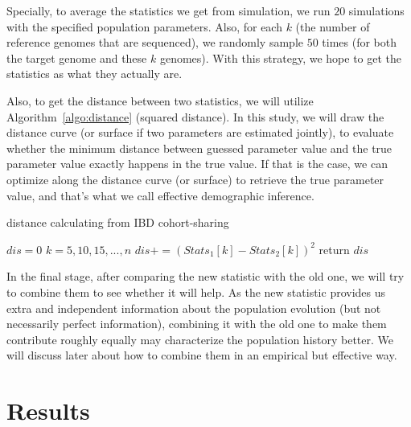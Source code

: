 \documentclass{bioinfo}
\begin{document}
\begin{methods}
Specially, to average the statistics we get from simulation, we run $20$ simulations with the specified population parameters. Also, for each $k$ (the number of reference genomes that are sequenced), we randomly sample $50$ times (for both the target genome and these $k$ genomes). With this strategy, we hope to get the statistics as what they actually are.

Also, to get the distance between two statistics, we will utilize Algorithm~\ref{algo:distance} (squared distance). In this study, we will draw the distance curve (or surface if two parameters are estimated jointly), to evaluate whether the minimum distance between guessed parameter value and the true parameter value exactly happens in the true value. If that is the case, we can optimize along the distance curve (or surface) to retrieve the true parameter value, and that's what we call effective demographic inference.

\begin{algorithm}
\caption{distance calculating from IBD cohort-sharing}
\label{algo:distance}
\vspace{-0.32cm}  %
\begin{codebox}
\li	$dis = 0$
\li	\For $k=5,10,15,...,n$
\li	\Do	$dis += (Stats_1[k] - Stats_2[k])^2$
	\End
\li	return $dis$
\end{codebox}
\vspace{-0.35cm}  %
\end{algorithm}

In the final stage, after comparing the new statistic with the old one, we will try to combine them to see whether it will help. As the new statistic provides us extra and independent information about the population evolution (but not necessarily perfect information), combining it with the old one to make them contribute roughly equally may characterize the population history better. We will discuss later about how to combine them in an empirical but effective way.

\end{methods}




\section{Results}
\end{document}
